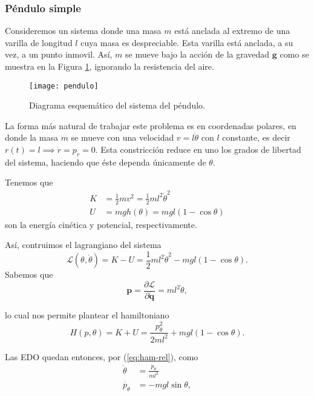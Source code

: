 \subsubsection{Péndulo simple}
\label{sec:pendulo}
Consideremos un sistema donde una masa $m$ está anclada al extremo de una varilla de longitud $l$ cuya masa es despreciable. Esta varilla está anclada, a su vez, a un punto inmovil. Así, $m$ se mueve bajo la acción de la gravedad $\mathbf{g}$ como se muestra en la Figura \ref{fig:pendulo}, ignorando la resistencia del aire.

\begin{figure}[h!]
 \centering
 \texttt{[image: pendulo]}
 \caption{Diagrama esquemático del sistema del péndulo.}
 \label{fig:pendulo}
\end{figure}


La forma más natural de trabajar este problema es en coordenadas polares, en donde la masa $m$ se mueve con una velocidad $v = l\dot{\theta}$ con $l$ constante, es decir $r(t) = l \implies \dot{r} = p_r = 0$. Esta constricción reduce en uno los grados de libertad del sistema, haciendo que éste dependa únicamente de $\theta$. 

Tenemos que 
\begin{align}
 K &= \frac{1}{2}m v^2 = \frac{1}{2} m l^2 \dot{\theta}^2 \nonumber \\
 U &= mgh(\theta) = mgl\left(1 - \cos{\theta} \right)
\end{align}
son la energía cinética y potencial, respectivamente. 

Así, contruimos el lagrangiano del sistema
\begin{equation*}
 \mathcal{L}(\theta,\dot{\theta}) = K - U = \frac{1}{2} m l^2 \dot{\theta}^2 - mgl\left(1 - \cos{\theta} \right).
\end{equation*}
Sabemos que
\begin{equation*}
 \mathbf{p} = \frac{\partial \mathcal{L}}{\partial \mathbf{\dot{q}}} = ml^2\dot{\theta},
\end{equation*}

lo cual nos permite plantear el hamiltoniano
\begin{equation}
 H(p,\theta) = K + U = \frac{p_{\theta}^2}{2ml^2} + mgl\left(1 - \cos{\theta} \right).
\label{eq:pendulo-ham}
\end{equation}
 
Las EDO quedan entonces, por (\ref{eq:ham-rel}), como
\begin{align}
 \dot{\theta} &= \frac{p_{\theta}}{ml^2} \nonumber \\
 \dot{p_{\theta}} &= -mgl\sin{\theta},
\label{eq:pendulo-ode}
\end{align}

